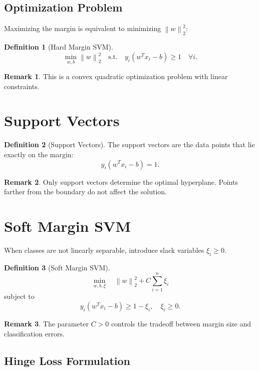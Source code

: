 \documentclass[12pt,oneside]{book}
\numberwithin{equation}{section}
\theoremstyle{definition}
\newtheorem{definition}{Definition}[section]
\newtheorem{remark}{Remark}[section]
\theoremstyle{plain}
\theoremstyle{remark}
\newcommand{\norm}[1]{\left\lVert #1 \right\rVert}
\begin{document}
\subsection{Optimization Problem}

Maximizing the margin is equivalent to minimizing $\norm{w}_2^2$:

\begin{definition}[Hard Margin SVM]
\[
\min_{w,b} \norm{w}_2^2
\quad \text{s.t.} \quad
y_i(w^T x_i - b) \ge 1
\quad \forall i.
\]
\end{definition}

\begin{remark}
This is a convex quadratic optimization problem with linear constraints.
\end{remark}

\section{Support Vectors}

\begin{definition}[Support Vectors]
The support vectors are the data points that lie exactly on the margin:
\[
y_i(w^T x_i - b) = 1.
\]
\end{definition}

\begin{remark}
Only support vectors determine the optimal hyperplane. Points farther from the boundary do not affect the solution.
\end{remark}

\section{Soft Margin SVM}

When classes are not linearly separable, introduce slack variables $\xi_i \ge 0$.

\begin{definition}[Soft Margin SVM]
\[
\min_{w,b,\xi}
\quad
\norm{w}_2^2 + C \sum_{i=1}^n \xi_i
\]
subject to
\[
y_i(w^T x_i - b) \ge 1 - \xi_i,
\quad
\xi_i \ge 0.
\]
\end{definition}

\begin{remark}
The parameter $C > 0$ controls the tradeoff between margin size and classification errors.
\end{remark}

\subsection{Hinge Loss Formulation}
\end{document}
